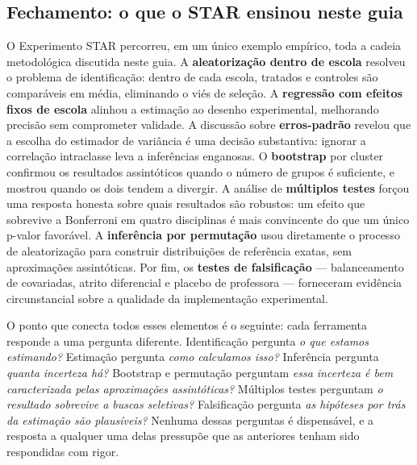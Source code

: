 \subsection*{Fechamento: o que o STAR ensinou neste guia}

O Experimento STAR percorreu, em um único exemplo empírico, toda a cadeia metodológica discutida neste guia. A \textbf{aleatorização dentro de escola} resolveu o problema de identificação: dentro de cada escola, tratados e controles são comparáveis em média, eliminando o viés de seleção. A \textbf{regressão com efeitos fixos de escola} alinhou a estimação ao desenho experimental, melhorando precisão sem comprometer validade. A discussão sobre \textbf{erros-padrão} revelou que a escolha do estimador de variância é uma decisão substantiva: ignorar a correlação intraclasse leva a inferências enganosas. O \textbf{bootstrap} por cluster confirmou os resultados assintóticos quando o número de grupos é suficiente, e mostrou quando os dois tendem a divergir. A análise de \textbf{múltiplos testes} forçou uma resposta honesta sobre quais resultados são robustos: um efeito que sobrevive a Bonferroni em quatro disciplinas é mais convincente do que um único p-valor favorável. A \textbf{inferência por permutação} usou diretamente o processo de aleatorização para construir distribuições de referência exatas, sem aproximações assintóticas. Por fim, os \textbf{testes de falsificação} --- balanceamento de covariadas, atrito diferencial e placebo de professora --- forneceram evidência circunstancial sobre a qualidade da implementação experimental.

O ponto que conecta todos esses elementos é o seguinte: cada ferramenta responde a uma pergunta diferente. Identificação pergunta \textit{o que estamos estimando?} Estimação pergunta \textit{como calculamos isso?} Inferência pergunta \textit{quanta incerteza há?} Bootstrap e permutação perguntam \textit{essa incerteza é bem caracterizada pelas aproximações assintóticas?} Múltiplos testes perguntam \textit{o resultado sobrevive a buscas seletivas?} Falsificação pergunta \textit{as hipóteses por trás da estimação são plausíveis?} Nenhuma dessas perguntas é dispensável, e a resposta a qualquer uma delas pressupõe que as anteriores tenham sido respondidas com rigor.
